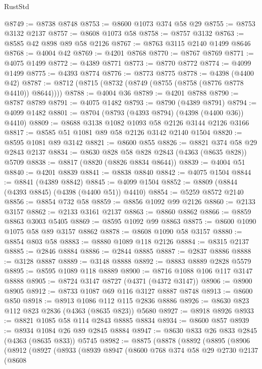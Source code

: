 \begin{lexlean}{RustStd}
\begin{coremodule}
@8749 := @8738 @8748
@8753 := @8600 @1073 @374 @58 @29
@8755 := @8753 @3132 @2137
@8757 := @8608 @1073 @58
@8758 := @8757 @3132
@8763 := @8585 @42 @898 @89 @58 @2126
@8767 := @8763 @3115 @2140 @1499 @8646
@8768 := @4004 @42
@8769 := @4201 @8768
@8770 := @8767 @8769
@8771 := @4075 @1499
@8772 := @4389 @8771
@8773 := @8770 @8772
@8774 := @4099 @1499
@8775 := @4393 @8774
@8776 := @8773 @8775
@8778 := @4398 (@4400 @42)
@8787 := @8712 (@8715 (@8732 (@8749 (@8755 (@8758 (@8776 @8778 @4410)) @8644))))
@8788 := @4004 @36
@8789 := @4201 @8788
@8790 := @8787 @8789
@8791 := @4075 @1482
@8793 := @8790 (@4389 @8791)
@8794 := @4099 @1482
@8801 := @8704 (@8793 (@4393 @8794) (@4398 (@4400 @36)) @4410)
@8809 := @8688 @3138 @1082 @1093 @58 @2126 @3144 @2126 @3166
@8817 := @8585 @51 @1081 @89 @58 @2126 @3142 @2140 @1504
@8820 := @8595 @1081 @89 @3142
@8821 := @8600 @855
@8826 := @8821 @374 @58 @29 @2843 @2137
@8834 := @8630 @828 @58 @828 @2843 (@4363 (@8635 @828)) @5709
@8838 := @8817 (@8820 (@8826 @8834 @8644))
@8839 := @4004 @51
@8840 := @4201 @8839
@8841 := @8838 @8840
@8842 := @4075 @1504
@8844 := @8841 (@4389 @8842)
@8845 := @4099 @1504
@8852 := @8809 (@8844 (@4393 @8845) (@4398 (@4400 @51)) @4410)
@8854 := @5259 @8572 @2140
@8856 := @8854 @732 @58
@8859 := @8856 @1092 @99 @2126
@8860 := @2133 @3157
@8862 := @2133 @3161 @2137
@8863 := @8860 @8862
@8866 := @8859 @8863 @3003 @5405
@8869 := @8595 @1092 @99 @8863
@8875 := @8600 @1090 @1075 @58 @89 @3157 @8862
@8878 := @8608 @1090 @58 @3157
@8880 := @8854 @803 @58
@8883 := @8880 @1089 @118 @2126
@8884 := @8315 @2137
@8885 := @2846 @8884
@8886 := @2844 @8885
@8887 := @2837 @8886
@8888 := @3128 @8887
@8889 := @3148 @8888
@8892 := @8883 @8889 @2828 @5579
@8895 := @8595 @1089 @118 @8889
@8900 := @8716 @1088 @106 @117 @3147 @8888
@8905 := @8724 @3147 @8727 (@4371 (@4372 @3147))
@8906 := @8900 @8905
@8912 := @8733 @1087 @69 @116 @3127 @8887 @8748
@8913 := @8600 @850
@8918 := @8913 @1086 @112 @115 @2836 @8886
@8926 := @8630 @823 @112 @823 @2836 (@4363 (@8635 @823)) @5680
@8927 := @8918 @8926
@8933 := @8821 @1085 @58 @114 @2843 @8885 @8834
@8934 := @8600 @857
@8939 := @8934 @1084 @26 @89 @2845 @8884
@8947 := @8630 @833 @26 @833 @2845 (@4363 (@8635 @833)) @5745
@8982 := @8875
    (@8878
      (@8892
        (@8895
          (@8906
            (@8912
              (@8927
                (@8933
                  (@8939
                    @8947
                    (@8600
                      @768
                      @374
                      @58
                      @29
                      @2730
                      @2137
                      (@8608

\end{coremodule}
\end{lexlean}
